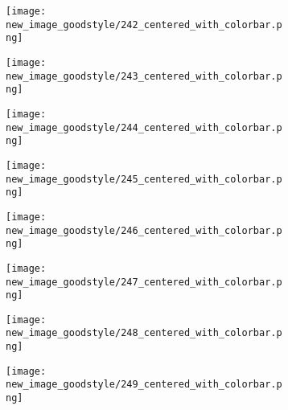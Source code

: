 \documentclass[a4paper,12pt]{article}
\begin{document}
\begin{figure}[H]
  \begin{subfigure}{0.11\textwidth}
    \texttt{[image: new\_image\_goodstyle/242\_centered\_with\_colorbar.png]}
  \end{subfigure}
  \hfill
  \begin{subfigure}{0.11\textwidth}
    \texttt{[image: new\_image\_goodstyle/243\_centered\_with\_colorbar.png]}
  \end{subfigure}
  \hfill
  \begin{subfigure}{0.11\textwidth}
    \texttt{[image: new\_image\_goodstyle/244\_centered\_with\_colorbar.png]}
  \end{subfigure}
  \hfill
  \begin{subfigure}{0.11\textwidth}
    \texttt{[image: new\_image\_goodstyle/245\_centered\_with\_colorbar.png]}
  \end{subfigure}
  \hfill
  \begin{subfigure}{0.11\textwidth}
    \texttt{[image: new\_image\_goodstyle/246\_centered\_with\_colorbar.png]}
  \end{subfigure}
  \hfill
  \begin{subfigure}{0.11\textwidth}
    \texttt{[image: new\_image\_goodstyle/247\_centered\_with\_colorbar.png]}
  \end{subfigure}
  \hfill
  \begin{subfigure}{0.11\textwidth}
    \texttt{[image: new\_image\_goodstyle/248\_centered\_with\_colorbar.png]}
  \end{subfigure}
  \hfill
  \begin{subfigure}{0.11\textwidth}
    \texttt{[image: new\_image\_goodstyle/249\_centered\_with\_colorbar.png]}
  \end{subfigure}
  \hfill
\end{figure}
\end{document}
